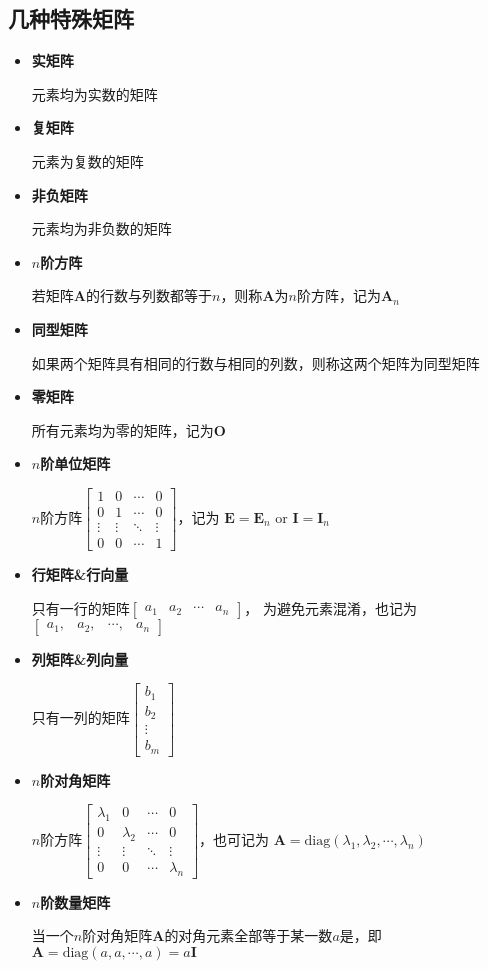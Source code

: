 \documentclass[UTF8]{ctexart}
\newcommand{\ve}[1]{{\bm{#1}}}
\newcommand{\mat}[1]{\ve{#1}}
\begin{document}
\subsection*{几种特殊矩阵}
\begin{itemize}
  \item \textbf{实矩阵}

  元素均为实数的矩阵
  \item \textbf{复矩阵}

  元素为复数的矩阵
  \item \textbf{非负矩阵}

  元素均为非负数的矩阵
  \item \textbf{$n$阶方阵}

  若矩阵$\mat{A}$的行数与列数都等于$n$，则称$\mat{A}$为$n$阶方阵，记为$\mat{A}_n$
  \item \textbf{同型矩阵}

  如果两个矩阵具有相同的行数与相同的列数，则称这两个矩阵为同型矩阵
  \item \textbf{零矩阵}

  所有元素均为零的矩阵，记为$\mat{O}$
  \item \textbf{$n$阶单位矩阵}

  $n$阶方阵$\displaystyle \begin{bmatrix}
  1&0&\cdots&0\\
  0&1&\cdots&0\\
  \vdots&\vdots&\ddots&\vdots\\
  0&0&\cdots&1
  \end{bmatrix}$，记为
  $\mat{E}=\mat{E}_n\text{ or }\mat{I}=\mat{I}_n$
  \item \textbf{行矩阵\&行向量}

  只有一行的矩阵$\displaystyle\begin{bmatrix}a_1&a_2&\cdots&a_n\end{bmatrix}$，
  为避免元素混淆，也记为$\displaystyle\begin{bmatrix}a_1,&a_2,&\cdots,&a_n\end{bmatrix}$
  \item \textbf{列矩阵\&列向量}

  只有一列的矩阵$\displaystyle\begin{bmatrix}b_1\\b_2\\\vdots\\b_m\end{bmatrix}$
  \item \textbf{$n$阶对角矩阵}

  $n$阶方阵$\displaystyle \begin{bmatrix}
  \lambda_1&0&\cdots&0\\
  0&\lambda_2&\cdots&0\\
  \vdots&\vdots&\ddots&\vdots\\
  0&0&\cdots&\lambda_n
  \end{bmatrix}$，也可记为
  $\mat{A}=\text{diag}(\lambda_1,\lambda_2,\cdots,\lambda_n)$
  \item \textbf{$n$阶数量矩阵}

  当一个$n$阶对角矩阵$\mat{A}$的对角元素全部等于某一数$a$是，即$\mat{A}=\text{diag}(a,a,\cdots,a)=a\mat{I}$
\end{itemize}
\end{document}
